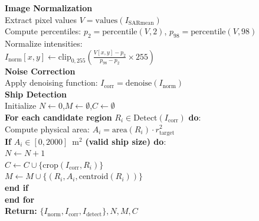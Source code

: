 \documentclass{article}
\begin{document}
\begin{algorithm}[H]
	\textbf{Image Normalization} \\
	\hspace*{1em} Extract pixel values $V = \mathrm{values}(I_\mathrm{SARmean})$ \\
	\hspace*{1em} Compute percentiles: $p_2 = \mathrm{percentile}(V, 2)$, $p_{98} = \mathrm{percentile}(V, 98)$ \\
	\hspace*{1em} Normalize intensities: \\
	\hspace*{2em} $I_\mathrm{norm}[x,y] \leftarrow \mathrm{clip}_{0,255} \left( \frac{V[x,y] - p_2}{p_{98}-p_2} \times 255 \right )$ \\
	
	\textbf{Noise Correction} \\
	\hspace*{1em} Apply denoising function: $I_\mathrm{corr} = \mathrm{denoise}(I_\mathrm{norm})$ \\
	
	\textbf{Ship Detection} \\
	\hspace*{1em} Initialize $N \leftarrow 0$,\quad $M \leftarrow \emptyset$,\quad $C \leftarrow \emptyset$ \\
	\hspace*{1em} \textbf{For each candidate region} $R_i \in \mathrm{Detect}(I_\mathrm{corr})$ \textbf{do}: \\
	\hspace*{2em} Compute physical area: $A_i = \mathrm{area}(R_i) \cdot r_\mathrm{target}^2$ \\
	\hspace*{2em} \textbf{If} $A_i \in [0, 2000]$~m$^2$ \textbf{(valid ship size) do}:\\
	\hspace*{3em} $N \leftarrow N + 1$ \\
	\hspace*{3em} $C \leftarrow C \cup \{\mathrm{crop}(I_\mathrm{corr}, R_i)\}$ \\
	\hspace*{3em} $M \leftarrow M \cup \{ (R_i, A_i, \mathrm{centroid}(R_i)) \}$ \\
	\hspace*{2em} \textbf{end if} \\
	\hspace*{1em} \textbf{end for} \\
	
	\textbf{Return:} $\{I_\mathrm{norm}, I_\mathrm{corr}, I_\mathrm{detect}\}, N, M, C$
	
\end{algorithm}
\end{document}
